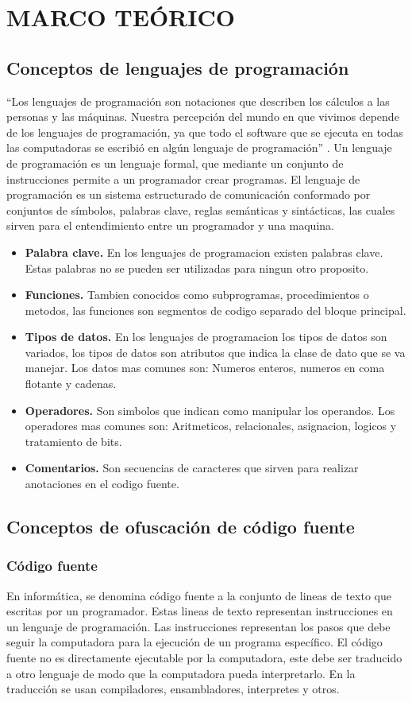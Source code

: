 \chapter{MARCO TEÓRICO}
\section{Conceptos de lenguajes de programación}
``Los lenguajes de programación son notaciones que describen los cálculos a las personas y las máquinas. Nuestra percepción del mundo en que vivimos depende de los lenguajes de programación, ya que todo el software que se ejecuta en todas las computadoras se escribió en algún lenguaje de programación'' \cite[p. 1]{Aho2008}. Un lenguaje de programación es un lenguaje formal, que mediante un conjunto de instrucciones permite a un programador crear programas. El lenguaje de programación es un sistema estructurado de comunicación conformado por conjuntos de símbolos, palabras clave, reglas semánticas y sintácticas, las cuales sirven para el entendimiento entre un programador y una maquina.
\begin{itemize}
    \item \textbf{Palabra clave.} En los lenguajes de programacion existen palabras clave. Estas palabras no se pueden ser utilizadas para ningun otro proposito.
    \item \textbf{Funciones.} Tambien conocidos como subprogramas, procedimientos o metodos, las funciones son segmentos de codigo separado del bloque principal.
    \item \textbf{Tipos de datos.} En los lenguajes de programacion los tipos de datos son variados, los tipos de datos son atributos que indica la clase de dato que se va manejar. Los datos mas comunes son: Numeros enteros, numeros en coma flotante y cadenas.
    \item \textbf{Operadores.} Son simbolos que indican como manipular los operandos. Los operadores mas comunes son: Aritmeticos, relacionales, asignacion, logicos y tratamiento de bits.
    \item \textbf{Comentarios.} Son secuencias de caracteres que sirven para realizar anotaciones en el codigo fuente.
\end{itemize}

\section{Conceptos de ofuscación de código fuente}
\subsection{Código fuente}
En informática, se denomina código fuente a la conjunto de lineas de texto que escritas por un programador. Estas lineas de texto representan instrucciones en un lenguaje de programación. Las instrucciones representan los pasos que debe seguir la computadora para la ejecución de un programa específico. El código fuente no es directamente ejecutable por la computadora, este debe ser traducido a otro lenguaje de modo que la computadora pueda interpretarlo. En la traducción se usan compiladores, ensambladores, interpretes y otros.

